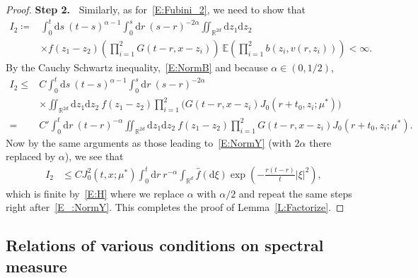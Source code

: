 \documentclass[sn-mathphys]{sn-jnl}%
\newcommand{\BR}{\mathbb{R}}
\newcommand{\E}{\mathbb{E}}
\newcommand{\ud}{\ensuremath{\mathrm{d}}}
\numberwithin{equation}{section}
\theoremstyle{thmstyleone}%
\theoremstyle{thmstyletwo}%
\theoremstyle{thmstylethree}%
\begin{document}
\begin{proof}
  \textbf{\noindent Step 2.~} Similarly, as for~\eqref{E:Fubini_2}, we need to show that
  \begin{align*}
    I_2\coloneqq & \int_0^t \ud s \: (t-s)^{\alpha-1} \int_0^s \ud r\: (s-r)^{-2\alpha} \iint_{\BR^{2d}} \ud z_1\ud z_2\: \\
                 & \times f(z_1-z_2) \left(\prod_{i = 1}^{2} G(t-r,x-z_i)\right) \: \E\left(\prod_{i = 1}^{2}b(z_i,v(r,z_i))\right) < \infty.
  \end{align*}
  By the Cauchy Schwartz inequality,~\eqref{E:NormB} and because $\alpha\in (0,1/2)$,
  \begin{align*}
    I_2\le & C \int_0^t \ud s \: (t-s)^{\alpha-1} \int_0^s \ud r\: (s-r)^{-2\alpha}                                                        \\
           & \times \iint_{\BR^{2d}} \ud z_1\ud z_2\:f(z_1-z_2) \prod_{i = 1}^{2}\bigg(G(t-r,x-z_i) J_0\left(r + t_0,z_i;\mu^*\right)\bigg) \\
         = & C' \int_0^t \ud r \: (t-r)^{-\alpha} \iint_{\BR^{2d}} \ud z_1\ud z_2\:f(z_1-z_2) \prod_{i = 1}^{2}G(t-r,x-z_i) J_0\left(r + t_0, z_i;\mu^*\right).
  \end{align*}
  Now by the same arguments as those leading to~\eqref{E:NormY} (with $2\alpha$ there replaced by
  $\alpha$), we see that
  \begin{align*}
    I_2 & \le C J_0^2\left(t,x; \mu^*\right) \int_0^t \ud r \: r^{-\alpha} \int_{\BR^d} \widehat{f}(\ud \xi)\exp\left(-\frac{r(t-r)}{t}\lvert\xi\rvert^2\right),
  \end{align*}
  which is finite by~\eqref{E:H} where we replace $\alpha$ with $\alpha/2$ and repeat the same steps
  right after~\eqref{E_:NormY}. This completes the proof of Lemma~\ref{L:Factorize}.
\end{proof}

%
%
%
%
%
%


\subsection{Relations of various conditions on spectral measure}
\end{document}
